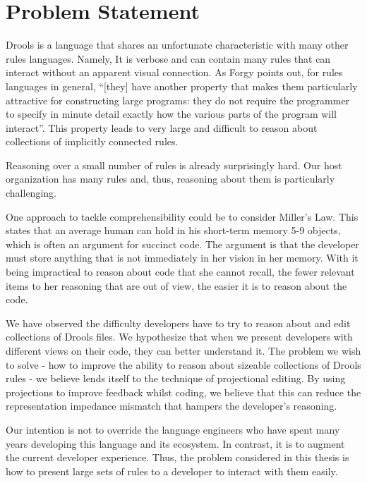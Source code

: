 \section{Problem Statement}

Drools is a language that shares an unfortunate characteristic with many other rules languages.
Namely, It is verbose and can contain many rules that can interact without an apparent visual connection.
As Forgy\cite{forgy1989rete} points out, for rules languages in general, ``[they] have another property that makes them particularly attractive for constructing large programs: they do not require the programmer to specify in minute detail exactly how the various parts of the program will interact''.
This property leads to very large and difficult to reason about collections of implicitly connected rules.

Reasoning over a small number of rules is already surprisingly hard.
Our host organization has many rules and, thus, reasoning about them is particularly challenging.

One approach to tackle comprehensibility could be to consider Miller's Law\cite{miller1956magical}.
This states that an average human can hold in his short-term memory 5-9 objects, which is often an argument for succinct code.
The argument is that the developer must store anything that is not immediately in her vision in her memory.
With it being impractical to reason about code that she cannot recall, the fewer relevant items to her reasoning that are out of view, the easier it is to reason about the code.

We have observed the difficulty developers have to try to reason about and edit collections of Drools files.
We hypothesize that when we present developers with different views on their code, they can better understand it.
The problem we wish to solve - how to improve the ability to reason about sizeable collections of Drools rules - we believe lends itself to the technique of projectional editing.
By using projections to improve feedback whilst coding, we believe that this can reduce the representation impedance mismatch that hampers the developer's reasoning.

Our intention is not to override the language engineers who have spent many years developing this language and its ecosystem.
In contrast, it is to augment the current developer experience.
Thus, the problem considered in this thesis is how to present large sets of rules to a developer to interact with them easily. 